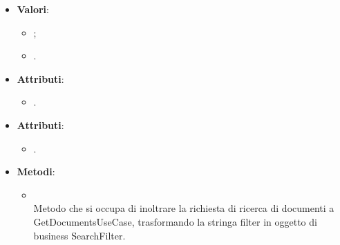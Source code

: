 \documentclass[10pt, a4paper]{article}
\begin{document}
\label{DocumentTypeDettaglio}
\begin{itemize}
    \item \textbf{Valori}:
    \begin{itemize}
        \item {};
        \item {}.
    \end{itemize}
\end{itemize}

\label{ElaborationExceptionDettaglio}
\begin{itemize}
    \item \textbf{Attributi}:
    \begin{itemize}
        \item {}.
    \end{itemize}
\end{itemize}


\label{GetDocumentsControllerDettaglio}
\begin{itemize}
    \item \textbf{Attributi}:
    \begin{itemize}
        \item {}.
    \end{itemize}
    \item \textbf{Metodi}:
    \begin{itemize}
        \item {}\\
        Metodo che si occupa di inoltrare la richiesta di ricerca di documenti a GetDocumentsUseCase, trasformando la stringa filter in oggetto di business SearchFilter.
    \end{itemize}
\end{itemize}
\end{document}
